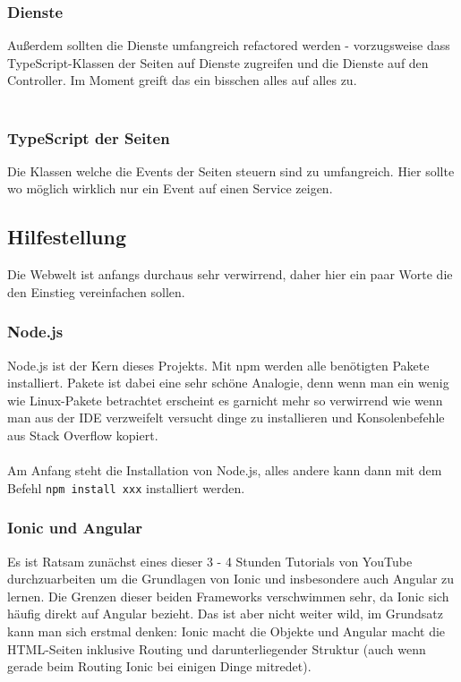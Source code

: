 \subsubsection*{Dienste}
Außerdem sollten die Dienste umfangreich refactored werden - vorzugsweise dass TypeScript-Klassen der Seiten auf Dienste zugreifen und die Dienste auf den Controller. Im Moment greift das ein bisschen alles auf alles zu.\\\\

\subsubsection*{TypeScript der Seiten}
Die Klassen welche die Events der Seiten steuern sind zu umfangreich. Hier sollte wo möglich wirklich nur ein Event auf einen Service zeigen.

\subsection{Hilfestellung}
Die Webwelt ist anfangs durchaus sehr verwirrend, daher hier ein paar Worte die den Einstieg vereinfachen sollen.

\subsubsection*{Node.js}
Node.js ist der Kern dieses Projekts. Mit npm werden alle benötigten Pakete installiert. \glqq Pakete\grqq{} ist dabei eine sehr schöne Analogie, denn wenn man ein wenig wie Linux-Pakete betrachtet erscheint es garnicht mehr so verwirrend wie wenn man aus der IDE verzweifelt versucht dinge zu installieren und Konsolenbefehle aus Stack Overflow kopiert.\\\\
Am Anfang steht die Installation von Node.js, alles andere kann dann mit dem Befehl \verb|npm install xxx| installiert werden.

\subsubsection*{Ionic und Angular}
Es ist Ratsam zunächst eines dieser 3 - 4 Stunden Tutorials von YouTube durchzuarbeiten um die Grundlagen von Ionic und insbesondere auch Angular zu lernen. Die Grenzen dieser beiden Frameworks verschwimmen sehr, da Ionic sich häufig direkt auf Angular bezieht. Das ist aber nicht weiter wild, im Grundsatz kann man sich erstmal denken: Ionic macht die Objekte und Angular macht die HTML-Seiten inklusive Routing und darunterliegender Struktur (auch wenn gerade beim Routing Ionic bei einigen Dinge mitredet).

